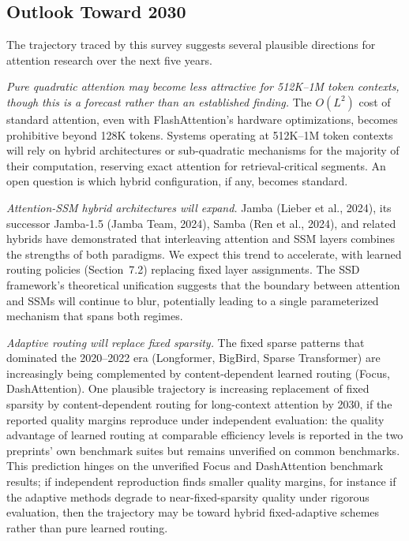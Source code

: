 \documentclass[10pt,twocolumn]{article}
\begin{document}
\subsection{Outlook Toward 2030}\label{outlook-toward-2030}

The trajectory traced by this survey suggests several plausible directions for attention research over the next five years.

\textit{Pure quadratic attention may become less attractive for 512K--1M token contexts, though this is a forecast rather than an established finding.} The $O(L^2)$ cost of standard attention, even with FlashAttention's hardware optimizations, becomes prohibitive beyond 128K tokens. Systems operating at 512K--1M token contexts will rely on hybrid architectures or sub-quadratic mechanisms for the majority of their computation, reserving exact attention for retrieval-critical segments. An open question is which hybrid configuration, if any, becomes standard.

\textit{Attention-SSM hybrid architectures will expand.} Jamba (Lieber et al., 2024), its successor Jamba-1.5 (Jamba Team, 2024), Samba (Ren et al., 2024), and related hybrids have demonstrated that interleaving attention and SSM layers combines the strengths of both paradigms. We expect this trend to accelerate, with learned routing policies (Section~7.2) replacing fixed layer assignments. The SSD framework's theoretical unification suggests that the boundary between attention and SSMs will continue to blur, potentially leading to a single parameterized mechanism that spans both regimes.

\textit{Adaptive routing will replace fixed sparsity.} The fixed sparse patterns that dominated the 2020--2022 era (Longformer, BigBird, Sparse Transformer) are increasingly being complemented by content-dependent learned routing (Focus, DashAttention). One plausible trajectory is increasing replacement of fixed sparsity by content-dependent routing for long-context attention by 2030, if the reported quality margins reproduce under independent evaluation: the quality advantage of learned routing at comparable efficiency levels is reported in the two preprints' own benchmark suites but remains unverified on common benchmarks. This prediction hinges on the unverified Focus and DashAttention benchmark results; if independent reproduction finds smaller quality margins, for instance if the adaptive methods degrade to near-fixed-sparsity quality under rigorous evaluation, then the trajectory may be toward hybrid fixed-adaptive schemes rather than pure learned routing.
\end{document}
